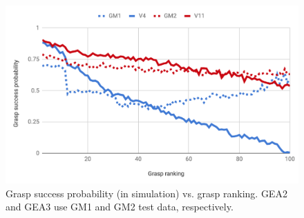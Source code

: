 
\begin{figure}[t]
  \includegraphics[width=\linewidth]{images/successvsranking.pdf}
  \caption{Grasp success probability (in simulation) vs. grasp ranking. GEA2 and GEA3 use GM1 and GM2 test data, respectively.}
  \label{fig:successvsranking}
\end{figure}


